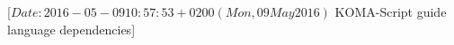 %
%
%
%
%
%
%
%
% 
%
%
%
%
%
                 [$Date: 2016-05-09 10:57:53 +0200 (Mon, 09 May 2016) $
                  KOMA-Script guide language dependencies]
%
%
\RequirePackage[normal]{engord}
%
%
